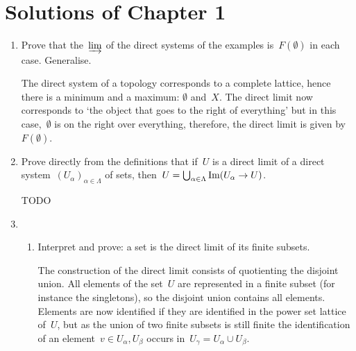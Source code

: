 \documentclass[a4paper,11pt]{article}
\begin{document}
\title{}
\author{
  Pieter Belmans
}
\maketitle

\tableofcontents

\section{Solutions of Chapter 1}
\begin{enumerate}
  \item Prove that the~$\varinjlim$ of the direct systems of the examples is~$F(\emptyset)$ in each case. Generalise.

    \begin{solution}
      The direct system of a topology corresponds to a complete lattice, hence there is a minimum and a maximum: $\emptyset$ and~$X$. The direct limit now corresponds to `the object that goes to the right of everything' but in this case,~$\emptyset$ is on the right over everything, therefore, the direct limit is given by~$F(\emptyset)$.
    \end{solution}

  \item Prove directly from the definitions that if~$U$ is a direct limit of a direct system~$(U_\alpha)_{\alpha\in\Lambda}$ of sets, then~$U=\bigcup_{\alpha\in\Lambda}\operatorname{Im}(U_\alpha\rightarrow U)$.

    \begin{solution}
      TODO
    \end{solution}

  \item
    \begin{enumerate}
      \item Interpret and prove: a set is the direct limit of its finite subsets.
      
        \begin{solution}
          The construction of the direct limit consists of quotienting the disjoint union. All elements of the set~$U$ are represented in a finite subset (for instance the singletons), so the disjoint union contains all elements. Elements are now identified if they are identified in the power set lattice of~$U$, but as the union of two finite subsets is still finite the identification of an element~$v\in U_\alpha,U_\beta$ occurs in~$U_\gamma=U_\alpha\cup U_\beta$.
        \end{solution}


\end{enumerate}
\end{enumerate}
\end{document}
